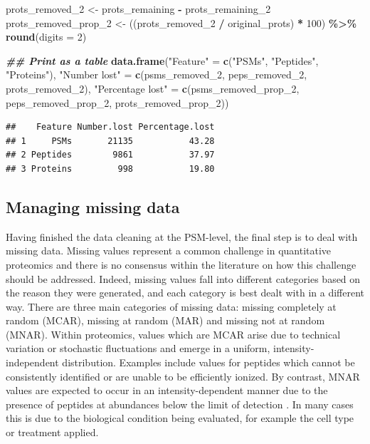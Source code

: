 \documentclass[9pt,a4paper,]{extarticle}
\newenvironment{Shaded}{\begin{snugshade}}{\end{snugshade}}
\newcommand{\AttributeTok}[1]{\textcolor[rgb]{0.13,0.29,0.53}{#1}}
\newcommand{\DecValTok}[1]{\textcolor[rgb]{0.00,0.00,0.81}{#1}}
\newcommand{\DocumentationTok}[1]{\textcolor[rgb]{0.56,0.35,0.01}{\textbf{\textit{#1}}}}
\newcommand{\FunctionTok}[1]{\textcolor[rgb]{0.13,0.29,0.53}{\textbf{#1}}}
\newcommand{\NormalTok}[1]{#1}
\newcommand{\OtherTok}[1]{\textcolor[rgb]{0.56,0.35,0.01}{#1}}
\newcommand{\SpecialCharTok}[1]{\textcolor[rgb]{0.81,0.36,0.00}{\textbf{#1}}}
\newcommand{\StringTok}[1]{\textcolor[rgb]{0.31,0.60,0.02}{#1}}
\begin{document}
\begin{Shaded}
\begin{Highlighting}[]
\NormalTok{prots\_removed\_2 }\OtherTok{\textless{}{-}}\NormalTok{ prots\_remaining }\SpecialCharTok{{-}}\NormalTok{ prots\_remaining\_2}
\NormalTok{prots\_removed\_prop\_2 }\OtherTok{\textless{}{-}}\NormalTok{ ((prots\_removed\_2 }\SpecialCharTok{/}\NormalTok{ original\_prots) }\SpecialCharTok{*} \DecValTok{100}\NormalTok{) }\SpecialCharTok{\%\textgreater{}\%}
  \FunctionTok{round}\NormalTok{(}\AttributeTok{digits =} \DecValTok{2}\NormalTok{)}


\DocumentationTok{\#\# Print as a table}
\FunctionTok{data.frame}\NormalTok{(}\StringTok{"Feature"} \OtherTok{=} \FunctionTok{c}\NormalTok{(}\StringTok{"PSMs"}\NormalTok{,}
                         \StringTok{"Peptides"}\NormalTok{,}
                         \StringTok{"Proteins"}\NormalTok{),}
           \StringTok{"Number lost"} \OtherTok{=} \FunctionTok{c}\NormalTok{(psms\_removed\_2,}
\NormalTok{                             peps\_removed\_2,}
\NormalTok{                             prots\_removed\_2),}
           \StringTok{"Percentage lost"} \OtherTok{=} \FunctionTok{c}\NormalTok{(psms\_removed\_prop\_2,}
\NormalTok{                                 peps\_removed\_prop\_2,}
\NormalTok{                                 prots\_removed\_prop\_2))}
\end{Highlighting}
\end{Shaded}

\begin{verbatim}
##    Feature Number.lost Percentage.lost
## 1     PSMs       21135           43.28
## 2 Peptides        9861           37.97
## 3 Proteins         998           19.80
\end{verbatim}

\subsection{Managing missing data}\label{managing-missing-data}

Having finished the data cleaning at the PSM-level, the final step is to deal
with missing data. Missing values represent a common challenge in quantitative
proteomics and there is no consensus within the literature on how this challenge
should be addressed. Indeed, missing values fall into different categories based
on the reason they were generated, and each category is best dealt with in a
different way. There are three main categories of missing data: missing
completely at random (MCAR), missing at random (MAR) and missing not at random
(MNAR). Within proteomics, values which are MCAR arise due to technical
variation or stochastic fluctuations and emerge in a uniform,
intensity-independent distribution. Examples include values for peptides which
cannot be consistently identified or are unable to be efficiently ionized. By
contrast, MNAR values are expected to occur in an intensity-dependent manner due
to the presence of peptides at abundances below the limit of detection
\citep{Karpievitch2009, Lazar2016, QFeat}. In many cases this is due to the biological
condition being evaluated, for example the cell type or treatment applied.
\end{document}
